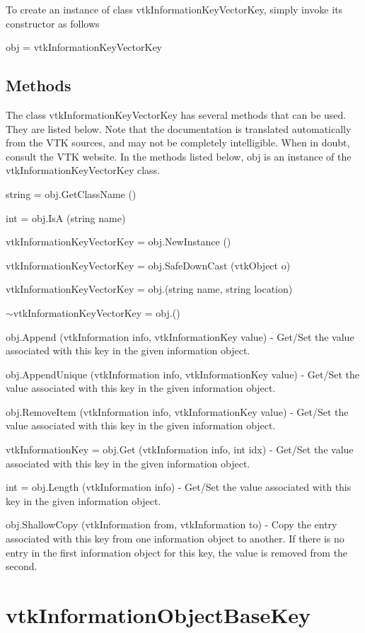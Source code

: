 To create an instance of class vtk\-Information\-Key\-Vector\-Key, simply invoke its constructor as follows \begin{DoxyVerb}  obj = vtkInformationKeyVectorKey
\end{DoxyVerb}
 \hypertarget{vtkwidgets_vtkxyplotwidget_Methods}{}\subsection{Methods}\label{vtkwidgets_vtkxyplotwidget_Methods}
The class vtk\-Information\-Key\-Vector\-Key has several methods that can be used. They are listed below. Note that the documentation is translated automatically from the V\-T\-K sources, and may not be completely intelligible. When in doubt, consult the V\-T\-K website. In the methods listed below, {\ttfamily obj} is an instance of the vtk\-Information\-Key\-Vector\-Key class. 
\begin{DoxyItemize}
\item {\ttfamily string = obj.\-Get\-Class\-Name ()}  
\item {\ttfamily int = obj.\-Is\-A (string name)}  
\item {\ttfamily vtk\-Information\-Key\-Vector\-Key = obj.\-New\-Instance ()}  
\item {\ttfamily vtk\-Information\-Key\-Vector\-Key = obj.\-Safe\-Down\-Cast (vtk\-Object o)}  
\item {\ttfamily vtk\-Information\-Key\-Vector\-Key = obj.(string name, string location)}  
\item {\ttfamily $\sim$vtk\-Information\-Key\-Vector\-Key = obj.()}  
\item {\ttfamily obj.\-Append (vtk\-Information info, vtk\-Information\-Key value)} -\/ Get/\-Set the value associated with this key in the given information object.  
\item {\ttfamily obj.\-Append\-Unique (vtk\-Information info, vtk\-Information\-Key value)} -\/ Get/\-Set the value associated with this key in the given information object.  
\item {\ttfamily obj.\-Remove\-Item (vtk\-Information info, vtk\-Information\-Key value)} -\/ Get/\-Set the value associated with this key in the given information object.  
\item {\ttfamily vtk\-Information\-Key = obj.\-Get (vtk\-Information info, int idx)} -\/ Get/\-Set the value associated with this key in the given information object.  
\item {\ttfamily int = obj.\-Length (vtk\-Information info)} -\/ Get/\-Set the value associated with this key in the given information object.  
\item {\ttfamily obj.\-Shallow\-Copy (vtk\-Information from, vtk\-Information to)} -\/ Copy the entry associated with this key from one information object to another. If there is no entry in the first information object for this key, the value is removed from the second.  
\end{DoxyItemize}\hypertarget{vtkcommon_vtkinformationobjectbasekey}{}\section{vtk\-Information\-Object\-Base\-Key}\label{vtkcommon_vtkinformationobjectbasekey}
